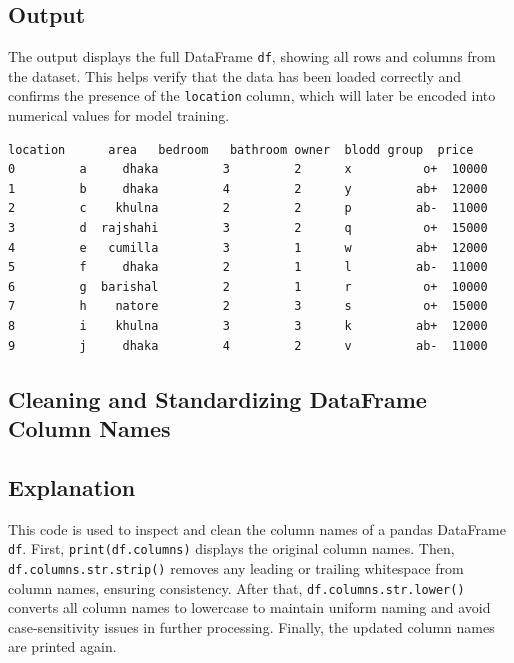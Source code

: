 \documentclass[11pt]{article}
\makeatletter
\newcommand{\boxspacing}{\kern\kvtcb@left@rule\kern\kvtcb@boxsep}
\newcommand{\prompt}[4]{
        {\ttfamily\llap{{\color{#2}[#3]:\hspace{3pt}#4}}\vspace{-\baselineskip}}
    }
\makeatother
\begin{document}
\subsection*{Output}
The output displays the full DataFrame \texttt{df}, showing all rows and columns from the dataset. This helps verify that the data has been loaded correctly and confirms the presence of the \texttt{location} column, which will later be encoded into numerical values for model training.
            \begin{tcolorbox}[breakable, size=fbox, boxrule=.5pt, pad at break*=1mm, opacityfill=0]
\prompt{Out}{outcolor}{96}{\boxspacing}
\begin{Verbatim}[commandchars=\\\{\}]
  location      area   bedroom   bathroom owner  blodd group  price
0         a     dhaka         3         2      x          o+  10000
1         b     dhaka         4         2      y         ab+  12000
2         c    khulna         2         2      p         ab-  11000
3         d  rajshahi         3         2      q          o+  15000
4         e   cumilla         3         1      w         ab+  12000
5         f     dhaka         2         1      l         ab-  11000
6         g  barishal         2         1      r          o+  10000
7         h    natore         2         3      s          o+  15000
8         i    khulna         3         3      k         ab+  12000
9         j     dhaka         4         2      v         ab-  11000
\end{Verbatim}
\end{tcolorbox}
 
 
 
\subsection{Cleaning and Standardizing DataFrame Column Names}
\subsection*{Explanation}
This code is used to inspect and clean the column names of a pandas DataFrame \texttt{df}. First, \texttt{print(df.columns)} displays the original column names. Then, \texttt{df.columns.str.strip()} removes any leading or trailing whitespace from column names, ensuring consistency. After that, \texttt{df.columns.str.lower()} converts all column names to lowercase to maintain uniform naming and avoid case-sensitivity issues in further processing. Finally, the updated column names are printed again.
\end{document}
